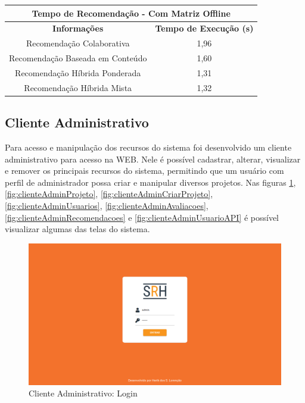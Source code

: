 \begin{table}[H]
\centering
\begin{tabular}{|c|c|}
\hline
\multicolumn{2}{|c|}{\textbf{Tempo de Recomendação - Com Matriz Offline}} \\ \hline
\textbf{Informações}                 & \textbf{Tempo de Execução (s)}    \\ \hline
Recomendação Colaborativa            & 1,96                               \\ \hline
Recomendação Baseada em Conteúdo     & 1,60                             \\ \hline
Recomendação Híbrida Ponderada       & 1,31                               \\ \hline
Recomendação Híbrida Mista           & 1,32                               \\ \hline
\end{tabular}
\end{table}
\subsection{Cliente Administrativo}

Para acesso e manipulação dos recursos do sistema foi desenvolvido um cliente administrativo para acesso na WEB. Nele é possível cadastrar, alterar, visualizar e remover os principais recursos do sistema, permitindo que um usuário com perfil de administrador possa criar e manipular diversos projetos. Nas figuras \ref{fig:clienteAdminLogin}, \ref{fig:clienteAdminProjeto}, \ref{fig:clienteAdminCriarProjeto}, \ref{fig:clienteAdminUsuarios}, \ref{fig:clienteAdminAvaliacoes}, \ref{fig:clienteAdminRecomendacoes} e \ref{fig:clienteAdminUsuarioAPI} é possível visualizar algumas das telas do sistema.

\begin{figure}[H]
	\centering
	\includegraphics[width=.9\linewidth]{imagens/adminLogin.png}
	\caption[Cliente Administrativo: Login]{Cliente Administrativo: Login}
    \label{fig:clienteAdminLogin}
\end{figure}

